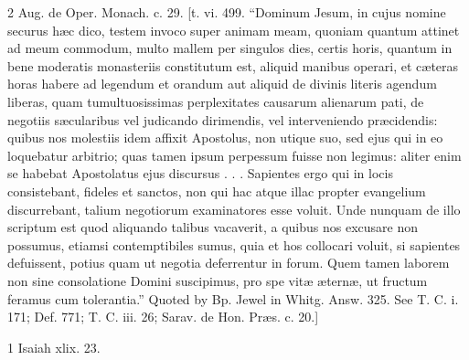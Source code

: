 2
Aug. de Oper. Monach. c. 29. [t. vi. 499. “Dominum Jesum, in cujus nomine securus hæc dico, testem invoco super animam meam, quoniam quantum attinet ad meum commodum, multo mallem per singulos dies, certis horis, quantum in bene moderatis monasteriis constitutum est, aliquid manibus operari, et cæteras horas habere ad legendum et orandum aut aliquid de divinis literis agendum liberas, quam tumultuosissimas perplexitates causarum alienarum pati, de negotiis sæcularibus vel judicando dirimendis, vel interveniendo præcidendis: quibus nos molestiis idem affixit Apostolus, non utique suo, sed ejus qui in eo loquebatur arbitrio; quas tamen ipsum perpessum fuisse non legimus: aliter enim se habebat Apostolatus ejus discursus . . . Sapientes ergo qui in locis consistebant, fideles et sanctos, non qui hac atque illac propter evangelium discurrebant, talium negotiorum examinatores esse voluit. Unde nunquam de illo scriptum est quod aliquando talibus vacaverit, a quibus nos excusare non possumus, etiamsi contemptibiles sumus, quia et hos collocari voluit, si sapientes defuissent, potius quam ut negotia deferrentur in forum. Quem tamen laborem non sine consolatione Domini suscipimus, pro spe vitæ æternæ, ut fructum feramus cum tolerantia.” Quoted by Bp. Jewel in Whitg. Answ. 325. See T. C. i. 171; Def. 771; T. C. iii. 26; Sarav. de Hon. Præs. c. 20.]

1
Isaiah xlix. 23.

